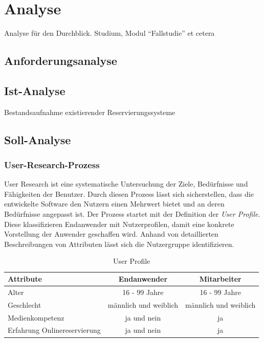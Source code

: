 \chapter{Analyse} \label{analyse}
	
	Analyse für den Durchblick.
	Studium, Modul \enquote{Fallstudie} et cetera
	
	\section{Anforderungsanalyse}
	
	\section{Ist-Analyse}
	Bestandsaufnahme existierender Reservierungssysteme
	
	\section{Soll-Analyse}
		
	 	\subsection{User-Research-Prozess} 
	 	User Research ist eine systematische Untersuchung der Ziele, Bedürfnisse und Fähigkeiten der Benutzer\autocite[Vgl.][S. 6]{Schumacher.2010}.
	 	Durch diesen Prozess lässt sich sicherstellen, dass die entwickelte Software den Nutzern einen Mehrwert bietet und an deren Bedürfnisse angepasst ist.
		Der Prozess startet mit der Definition der \textit{User Profile}. Diese klassifizieren Endanwender mit Nutzerprofilen, damit eine konkrete Vorstellung der Anwender geschaffen wird. Anhand von detaillierten Beschreibungen von Attributen lässt sich die Nutzergruppe identifizieren.
		
		\begin{table}[H]
			\centering
			\begin{tabular}{p{} || c | c }
				\textbf{Attribute} & \textbf{Endanwender} & \textbf{Mitarbeiter} \\\toprule
				Alter &  16 - 99 Jahre &  16 - 99 Jahre \\
				Geschlecht &  männlich und weiblich &  männlich und weiblich  \\
				Medienkompetenz &  ja und nein &  ja  \\
				Erfahrung Onlinereservierung &  ja und nein &  ja  \\
			\end{tabular}
			\caption[User Profile]{\label{tab:tabelleUserProfile}User Profile}
		\end{table}
		
